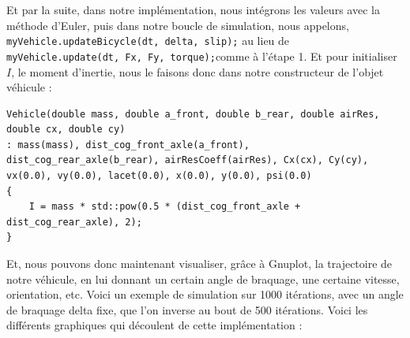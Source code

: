 Et par la suite, dans notre implémentation, nous intégrons les valeurs avec la méthode d'Euler, puis dans notre boucle de simulation, nous appelons, \texttt{myVehicle.updateBicycle(dt, delta, slip);} au lieu de \texttt{myVehicle.update(dt, Fx, Fy, torque);}comme à l'étape 1. Et pour initialiser $I$, le moment d'inertie, nous le faisons donc dans notre constructeur de l'objet véhicule :
\begin{lstlisting}[style=CStyle]
Vehicle(double mass, double a_front, double b_rear, double airRes, double cx, double cy)
: mass(mass), dist_cog_front_axle(a_front), dist_cog_rear_axle(b_rear), airResCoeff(airRes), Cx(cx), Cy(cy), vx(0.0), vy(0.0), lacet(0.0), x(0.0), y(0.0), psi(0.0)
{
    I = mass * std::pow(0.5 * (dist_cog_front_axle + dist_cog_rear_axle), 2);
}
\end{lstlisting}

Et, nous pouvons donc maintenant visualiser, grâce à Gnuplot, la trajectoire de notre véhicule, en lui donnant un certain angle de braquage, une certaine vitesse, orientation, etc. Voici un exemple de simulation sur 1000 itérations, avec un angle de braquage delta fixe, que l'on inverse au bout de 500 itérations.
Voici les différents graphiques qui découlent de cette implémentation :


